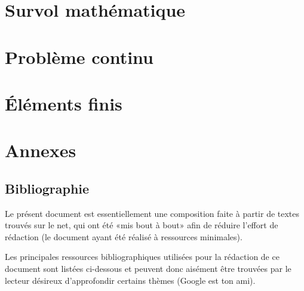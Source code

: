 \documentclass[11pt,pdflatex]{book}
\begin{document}
\fi

\cleardoublepage
\tableofcontents


 \part{Survol mathématique}
 
 
 
 
 
 

 \part{Problème continu}
 
 
 
 

 \part{Éléments finis}
 
 
 
 
 
 
 
 
 
 
 
 
 

 \appendix
 \part{Annexes}
 
 
 
 
 


\ifVersionDuDocEstVincent
   \chapter*{Bibliographie}

 Le présent document est essentiellement une composition faite à partir de textes trouvés sur le net, qui ont été «mis bout à bout» afin de réduire l'effort  de rédaction (le document ayant été réalisé à ressources minimales).

 Les principales  ressources bibliographiques utilisées pour la rédaction de ce document  sont listées ci-dessous et peuvent donc aisément être trouvées par le lecteur désireux d'approfondir certains thèmes (Google est ton ami).
\end{document}
